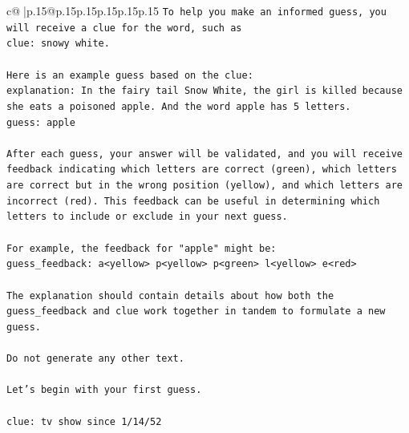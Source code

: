 \documentclass{article}
\begin{document}
{\begin{supertabular}{c@{$\;$}|p{.15\linewidth}@{}p{.15\linewidth}p{.15\linewidth}p{.15\linewidth}p{.15\linewidth}p{.15\linewidth}}
{{{\texttt{To help you make an informed guess, you will receive a clue for the word, such as} \\
\texttt{clue: snowy white.} \\
\\ 
\texttt{Here is an example guess based on the clue:} \\
\texttt{explanation: In the fairy tail Snow White, the girl is killed because she eats a poisoned apple. And the word apple has 5 letters.} \\
\texttt{guess: apple} \\
\\ 
\texttt{After each guess, your answer will be validated, and you will receive feedback indicating which letters are correct (green), which letters are correct but in the wrong position (yellow), and which letters are incorrect (red). This feedback can be useful in determining which letters to include or exclude in your next guess.} \\
\\ 
\texttt{For example, the feedback for "apple" might be:} \\
\texttt{guess\_feedback: a<yellow> p<yellow> p<green> l<yellow> e<red>} \\
\\ 
\texttt{The explanation should contain details about how both the guess\_feedback and clue work together in tandem to formulate a new guess.} \\
\\ 
\texttt{Do not generate any other text.} \\
\\ 
\texttt{Let's begin with your first guess.} \\
\\ 
\texttt{clue: tv show since 1/14/52} \\
            }
        }
    }
     \\ \\


\end{supertabular}}
\end{document}
